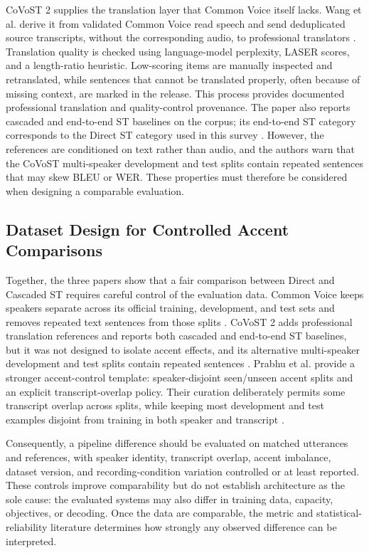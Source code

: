 CoVoST 2 supplies the translation layer that Common Voice itself lacks. Wang
et al. derive it from validated Common Voice read speech and send deduplicated
source transcripts, without the corresponding audio, to professional
translators \cite{wang2021covost2}. Translation quality is checked using
language-model perplexity, LASER scores, and a length-ratio heuristic.
Low-scoring items are manually inspected and retranslated, while sentences
that cannot be translated properly, often because of missing context, are
marked in the release. This process provides documented professional
translation and quality-control provenance. The paper also reports cascaded
and end-to-end ST baselines on the corpus; its end-to-end ST category
corresponds to the Direct ST category used in this survey
\cite{wang2021covost2}. However, the references are conditioned on text rather
than audio, and the authors warn that the CoVoST multi-speaker development and
test splits contain repeated sentences that may skew BLEU or WER. These
properties must therefore be considered when designing a comparable
evaluation.

\subsection{Dataset Design for Controlled Accent Comparisons}

Together, the three papers show that a fair comparison between Direct and
Cascaded ST requires careful control of the evaluation data. Common Voice
keeps speakers separate across its official training, development, and test
sets and removes repeated text sentences from those splits
\cite{ardila2020commonvoice}. CoVoST 2 adds professional translation
references and reports both cascaded and end-to-end ST baselines, but it was
not designed to isolate accent effects, and its alternative multi-speaker
development and test splits contain repeated sentences
\cite{wang2021covost2}. Prabhu et al. provide a stronger accent-control
template: speaker-disjoint seen/unseen accent splits and an explicit
transcript-overlap policy. Their curation deliberately permits some transcript
overlap across splits, while keeping most development and test examples
disjoint from training in both speaker and transcript
\cite{prabhu2023accentcodebooks}.

Consequently, a pipeline difference should be evaluated on matched utterances
and references, with speaker identity, transcript overlap, accent imbalance,
dataset version, and recording-condition variation controlled or at
least reported. These controls improve comparability but do not establish
architecture as the sole cause: the evaluated systems may also differ in
training data, capacity, objectives, or decoding. Once the data are comparable,
the metric and statistical-reliability literature determines how strongly any
observed difference can be interpreted.

